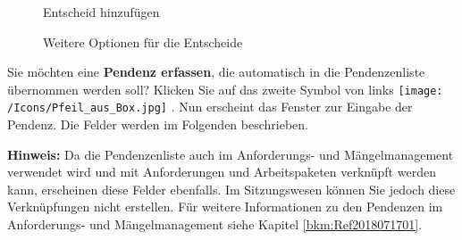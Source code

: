 \begin{figure}[H]
\caption{Entscheid hinzufügen}
\end{figure}

\begin{figure}[H]
\caption{Weitere Optionen für die Entscheide}
\end{figure}

Sie möchten eine \textbf{Pendenz erfassen}, die automatisch in die Pendenzenliste übernommen werden soll? Klicken Sie auf das zweite Symbol von links \texttt{[image: /Icons/Pfeil\_aus\_Box.jpg]} . Nun erscheint das Fenster zur Eingabe der Pendenz. Die Felder werden im Folgenden beschrieben. 

\vspace{\baselineskip}

\textbf{Hinweis:} Da die Pendenzenliste auch im Anforderungs- und Mängelmanagement verwendet wird und mit Anforderungen und Arbeitspaketen verknüpft werden kann, erscheinen diese Felder ebenfalls. Im Sitzungswesen können Sie jedoch diese Verknüpfungen nicht erstellen. Für weitere Informationen zu den Pendenzen im Anforderungs- und Mängelmanagement siehe Kapitel \ref{bkm:Ref2018071701}.

